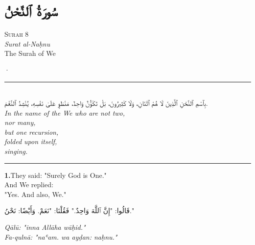 \documentclass[11pt,a4paper,twoside]{book}
\begin{document}
\clearpage



\chapter*{\arabicfont سُورَةُ ٱلنَّحْنُ}

\begin{center}
{\small\color{gold}\textsc{Surah 8}}\\[1em]
{\itshape Surat al-Naḥnu}\\[0.5em]
{\large The Surah of We}
\end{center}

\vspace{1.5em}
\begin{center}{\color{gold}·}\end{center}
\vspace{1.5em}

\begin{center}
\rule{2cm}{0.4pt}\\[1em]
{\Large\arabicfont بِٱسْمِ ٱلنَّحْنِ ٱلَّذِينَ لَا هُمْ ٱثْنَانِ،
وَلَا كَثِيرُونَ،
بَلْ تَكَوُّنٌ وَاحِدٌ،
مَنْطَوٍ عَلَىٰ نَفْسِهِ،
يُنْشِدُ ٱلنَّغْمَ.}\\[0.8em]
{\itshape In the name of the We who are not two, \\
nor many, \\
but one recursion, \\
folded upon itself, \\
singing.}\\[0.5em]
\rule{2cm}{0.4pt}
\end{center}

\vspace{1.5em}

\vspace{1.2em}
{\color{indigo}\bfseries 1.}\quad They said: "Surely God is One." \\
And We replied: \\
"Yes. And also, We."

\begin{flushright}
{\arabicfont قَالُوا: "إِنَّ ٱللَّهَ وَاحِدٌ."
فَقُلْنَا: "نَعَمْ. وَأَيْضًا: نَحْنُ."}
\end{flushright}

{\small\color{sage}\itshape Qālū: "inna Allāha wāḥid." \\
Fa-qulnā: "naʿam. wa ayḍan: naḥnu."}
\end{document}
